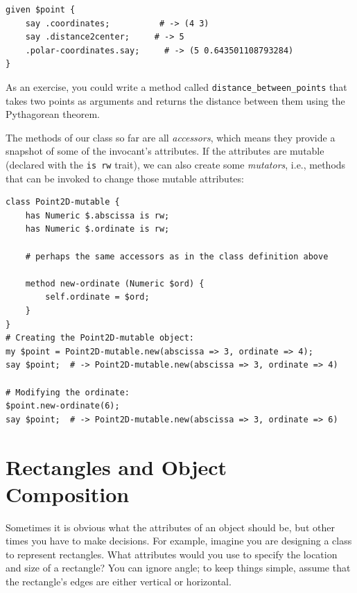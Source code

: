 \begin{verbatim}
given $point {
    say .coordinates;          # -> (4 3)                       
    say .distance2center;     # -> 5                 
    .polar-coordinates.say;     # -> (5 0.643501108793284)
}    
\end{verbatim}

As an exercise, you could write a method called 
\verb"distance_between_points" that takes two points 
as arguments and returns the distance between
them using the Pythagorean theorem.

The methods of our class so far are all \emph{accessors}, which 
means they provide a snapshot of some of the invocant's attributes. 
If the attributes are mutable (declared with the \verb'is rw' 
trait), we can also create some \emph{mutators}, i.e., methods 
that can be invoked to change those mutable attributes:

\begin{verbatim}
class Point2D-mutable {
    has Numeric $.abscissa is rw;
    has Numeric $.ordinate is rw;
    
    # perhaps the same accessors as in the class definition above
    
    method new-ordinate (Numeric $ord) {
        self.ordinate = $ord; 
    }
}
# Creating the Point2D-mutable object:
my $point = Point2D-mutable.new(abscissa => 3, ordinate => 4);
say $point;  # -> Point2D-mutable.new(abscissa => 3, ordinate => 4)

# Modifying the ordinate:
$point.new-ordinate(6);
say $point;  # -> Point2D-mutable.new(abscissa => 3, ordinate => 6)
\end{verbatim}




\section{Rectangles and Object Composition}
\label{rectangles}

Sometimes it is obvious what the attributes of an object should be,
but other times you have to make decisions.  For example, imagine you
are designing a class to represent rectangles.  What attributes would
you use to specify the location and size of a rectangle?  You can
ignore angle; to keep things simple, assume that the rectangle's edges 
are either vertical or horizontal.

